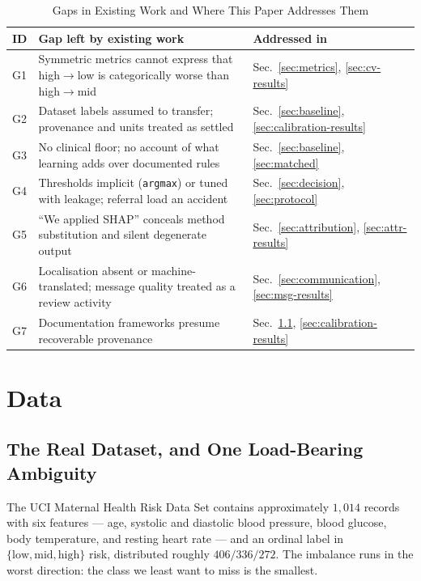 \documentclass[journal]{IEEEtran}
\newcommand{\hdr}[1]{\textbf{#1}}
\begin{document}
\begin{table}[!t]
\renewcommand{\arraystretch}{1.25}
\caption{Gaps in Existing Work and Where This Paper Addresses Them}
\label{tab:gaps}
\centering
\footnotesize
\begin{tabular}{@{}p{}p{}p{}@{}}
\toprule
\hdr{ID} & \hdr{Gap left by existing work} & \hdr{Addressed in} \\
\midrule
G1 & Symmetric metrics cannot express that high$\rightarrow$low is
categorically worse than high$\rightarrow$mid &
Sec.~\ref{sec:metrics}, \ref{sec:cv-results} \\
G2 & Dataset labels assumed to transfer; provenance and units treated as
settled & Sec.~\ref{sec:baseline}, \ref{sec:calibration-results} \\
G3 & No clinical floor; no account of what learning adds over documented rules
& Sec.~\ref{sec:baseline}, \ref{sec:matched} \\
G4 & Thresholds implicit (\texttt{argmax}) or tuned with leakage; referral load
an accident & Sec.~\ref{sec:decision}, \ref{sec:protocol} \\
G5 & ``We applied SHAP'' conceals method substitution and silent degenerate
output & Sec.~\ref{sec:attribution}, \ref{sec:attr-results} \\
G6 & Localisation absent or machine-translated; message quality treated as a
review activity & Sec.~\ref{sec:communication}, \ref{sec:msg-results} \\
G7 & Documentation frameworks presume recoverable provenance &
Sec.~\ref{sec:data-real}, \ref{sec:calibration-results} \\
\bottomrule
\end{tabular}
\end{table}

\section{Data}

\subsection{The Real Dataset, and One Load-Bearing Ambiguity}
\label{sec:data-real}

The UCI Maternal Health Risk Data Set contains approximately $1{,}014$ records
with six features --- age, systolic and diastolic blood pressure, blood glucose,
body temperature, and resting heart rate --- and an ordinal label in
$\{\text{low}, \text{mid}, \text{high}\}$ risk, distributed roughly
$406/336/272$. The imbalance runs in the worst direction: the class we least
want to miss is the smallest.
\end{document}
